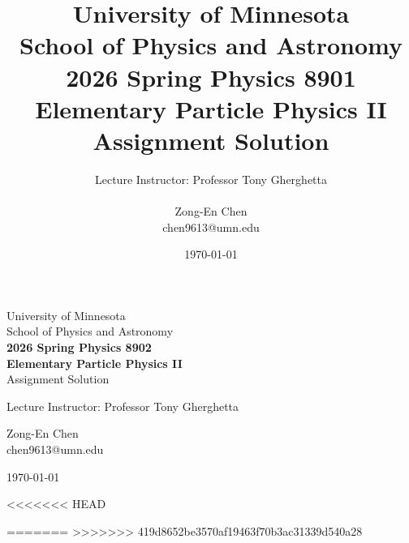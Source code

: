 \documentclass[12pt,letterpaper]{article}
\title{University of Minnesota\\
School of Physics and Astronomy\\
\textbf{2026 Spring Physics 8901\\Elementary Particle Physics II}\\ 
Assignment Solution}
\author{Lecture Instructor: Professor Tony Gherghetta \\ \\
        Zong-En Chen\\ chen9613@umn.edu}
\date{\today}
\begin{document}
\onehalfspacing
\begin{titlepage}
    \centering
    \vspace*{\fill} %
    {\LARGE University of Minnesota\\
    School of Physics and Astronomy\\[1em]
    \textbf{2026 Spring Physics 8902\\Elementary Particle Physics II}\\ 
    Assignment Solution \par}
    \vspace{2cm}
    {\large Lecture Instructor: Professor Tony Gherghetta \par}
    \vspace{1cm}
    {\large Zong-En Chen\\ chen9613@umn.edu \par}
    \vspace{2cm}
    {\large \today \par}
    \vspace*{\fill} %
\end{titlepage}


<<<<<<< HEAD






=======
%
%
%
%
%
%
>>>>>>> 419d8652be3570af19463f70b3ac31339d540a28

\end{document}
